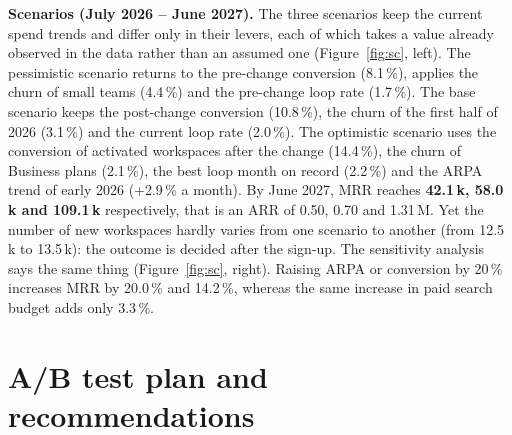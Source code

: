 \documentclass{rapportIMT}
\newcommand{\eur}{\texteuro{}}
\newcommand{\Meur}{\,M\eur}
\newcommand{\pc}{\,\%}
\begin{document}
\textbf{Scenarios (July 2026 -- June 2027).} The three scenarios keep the current spend trends and differ only in their levers, each of which takes a value already observed in the data rather than an assumed one (Figure~\ref{fig:sc}, left). The pessimistic scenario returns to the pre-change conversion (8.1\pc{}), applies the churn of small teams (4.4\pc{}) and the pre-change loop rate (1.7\pc{}). The base scenario keeps the post-change conversion (10.8\pc{}), the churn of the first half of 2026 (3.1\pc{}) and the current loop rate (2.0\pc{}). The optimistic scenario uses the conversion of activated workspaces after the change (14.4\pc{}), the churn of Business plans (2.1\pc{}), the best loop month on record (2.2\pc{}) and the ARPA trend of early 2026 (+2.9\pc{} a month). By June 2027, MRR reaches \textbf{42.1\,k\eur{}, 58.0\,k\eur{} and 109.1\,k\eur{}} respectively, that is an ARR of 0.50, 0.70 and 1.31\Meur. Yet the number of new workspaces hardly varies from one scenario to another (from 12.5\,k to 13.5\,k): the outcome is decided after the sign-up. The sensitivity analysis says the same thing (Figure~\ref{fig:sc}, right). Raising ARPA or conversion by 20\pc{} increases MRR by 20.0\pc{} and 14.2\pc{}, whereas the same increase in paid search budget adds only 3.3\pc{}.

\section{A/B test plan and recommendations}
\label{sec:ab}
\end{document}
